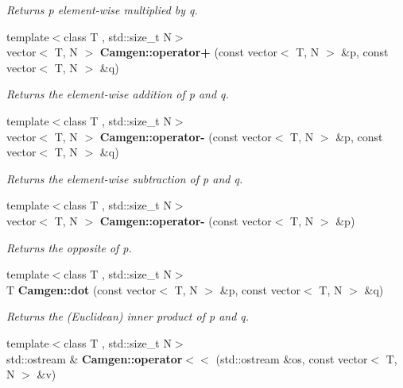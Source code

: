 \begin{DoxyCompactItemize}
\begin{DoxyCompactList}\small\item\em Returns p element-\/wise multiplied by q. \end{DoxyCompactList}\item 
\hypertarget{a00878_a3c27a507e22beba92beb7bb95918ca55}{}{\footnotesize template$<$class T , std\+::size\+\_\+t N$>$ }\\vector$<$ T, N $>$ {\bfseries Camgen\+::operator+} (const vector$<$ T, N $>$ \&p, const vector$<$ T, N $>$ \&q)\label{a00878_a3c27a507e22beba92beb7bb95918ca55}

\begin{DoxyCompactList}\small\item\em Returns the element-\/wise addition of p and q. \end{DoxyCompactList}\item 
\hypertarget{a00878_aecb2ec65494e235a9612ee3a0aa8d82f}{}{\footnotesize template$<$class T , std\+::size\+\_\+t N$>$ }\\vector$<$ T, N $>$ {\bfseries Camgen\+::operator-\/} (const vector$<$ T, N $>$ \&p, const vector$<$ T, N $>$ \&q)\label{a00878_aecb2ec65494e235a9612ee3a0aa8d82f}

\begin{DoxyCompactList}\small\item\em Returns the element-\/wise subtraction of p and q. \end{DoxyCompactList}\item 
\hypertarget{a00878_aca382570fc4587c321288db3aa9d6db0}{}{\footnotesize template$<$class T , std\+::size\+\_\+t N$>$ }\\vector$<$ T, N $>$ {\bfseries Camgen\+::operator-\/} (const vector$<$ T, N $>$ \&p)\label{a00878_aca382570fc4587c321288db3aa9d6db0}

\begin{DoxyCompactList}\small\item\em Returns the opposite of p. \end{DoxyCompactList}\item 
\hypertarget{a00878_a4edf9f4a232c5b25cf0506f1e6b38a0c}{}{\footnotesize template$<$class T , std\+::size\+\_\+t N$>$ }\\T {\bfseries Camgen\+::dot} (const vector$<$ T, N $>$ \&p, const vector$<$ T, N $>$ \&q)\label{a00878_a4edf9f4a232c5b25cf0506f1e6b38a0c}

\begin{DoxyCompactList}\small\item\em Returns the (Euclidean) inner product of p and q. \end{DoxyCompactList}\item 
\hypertarget{a00878_abff9233b14623333b2939868ef957e60}{}{\footnotesize template$<$class T , std\+::size\+\_\+t N$>$ }\\std\+::ostream \& {\bfseries Camgen\+::operator$<$$<$} (std\+::ostream \&os, const vector$<$ T, N $>$ \&v)\label{a00878_abff9233b14623333b2939868ef957e60}


\end{DoxyCompactItemize}
